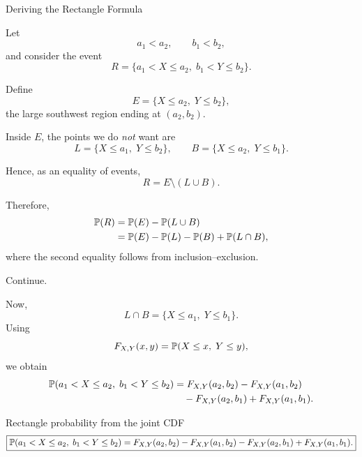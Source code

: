  





\begin{frame}{Deriving the Rectangle Formula}

Let
$$
a_1<a_2,
\qquad
b_1<b_2,
$$
and consider the event
$$
R=\{a_1<X\le a_2,\;b_1<Y\le b_2\}.
$$

Define
$$
E=\{X\le a_2,\;Y\le b_2\},
$$
the large southwest region ending at $(a_2,b_2)$.

Inside $E$, the points we do \emph{not} want are
$$
L=\{X\le a_1,\;Y\le b_2\},
\qquad
B=\{X\le a_2,\;Y\le b_1\}.
$$

Hence, as an equality of events,
$$
\boxed{
R=E\setminus(L\cup B).
}
$$

Therefore,
$$
\begin{aligned}
\mathbb{P}(R)
&=\mathbb{P}(E)-\mathbb{P}(L\cup B)\\
&=\mathbb{P}(E)-\mathbb{P}(L)-\mathbb{P}(B)+\mathbb{P}(L\cap B),
\end{aligned}
$$
where the second equality follows from inclusion--exclusion.


\end{frame}



\begin{frame}{Continue.}
    
Now,
$$
L\cap B
=
\{X\le a_1,\;Y\le b_1\}.
$$
Using
$$
F_{X,Y}(x,y)=\mathbb{P}(X\le x,\;Y\le y),
$$
we obtain
$$
\begin{aligned}
\mathbb{P}(a_1<X\le a_2,\;b_1<Y\le b_2)
&=
F_{X,Y}(a_2,b_2)
-
F_{X,Y}(a_1,b_2)
\\
&\quad
-
F_{X,Y}(a_2,b_1)
+
F_{X,Y}(a_1,b_1).
\end{aligned}
$$

\begin{keybox}{Rectangle probability from the joint CDF}
$$
\boxed{
\mathbb{P}(a_1<X\le a_2,\;b_1<Y\le b_2)
=
F_{X,Y}(a_2,b_2)
-
F_{X,Y}(a_1,b_2)
-
F_{X,Y}(a_2,b_1)
+
F_{X,Y}(a_1,b_1).
}
$$
\end{keybox}

\end{frame}





 








 







